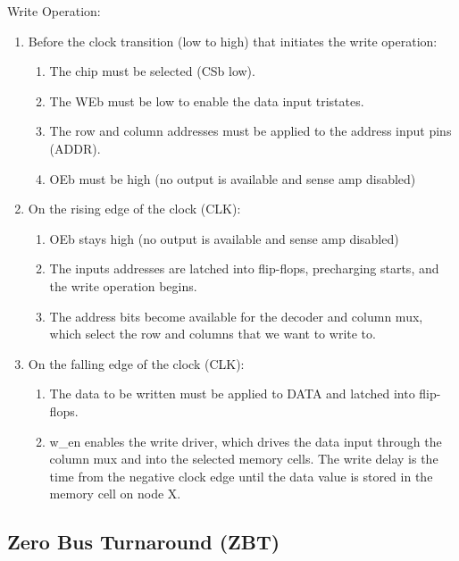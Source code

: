 Write Operation:
\begin{enumerate}
\setlength{\itemsep}{0pt}
 \item Before the clock transition (low to high) that initiates the write operation:
  \begin{enumerate}
	\item The chip must be selected (CSb low).
	\item The WEb must be low to enable the data input tristates.
	\item The row and column addresses must be applied to the address input pins (ADDR).
	\item OEb must be high (no output is available and sense amp disabled)
  \end{enumerate}
 \item On the rising edge of the clock (CLK):
   \begin{enumerate}
	\item OEb stays high (no output is available and sense amp disabled)
	\item The inputs addresses are latched into flip-flops, precharging starts, and the write operation begins.
	\item The address bits become available for the decoder and column mux, which select the row and columns that we want to write to.
  \end{enumerate}	         
 \item On the falling edge of the clock (CLK):
   \begin{enumerate}
	\item The data to be written must be applied to DATA and latched into flip-flops.
	\item w\_en enables the write driver, which drives the data input through the column mux and into the selected memory cells.  The write delay is the time from the negative clock edge until the data value is stored in the memory cell on node X.
   \end{enumerate}
\end{enumerate}


\subsection{Zero Bus Turnaround (ZBT)}
\label{sec:ZBT}


